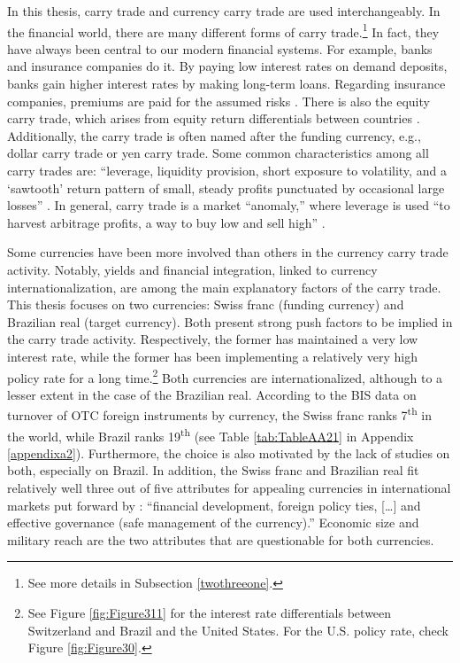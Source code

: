 \documentclass[a4paper, twoside]{templates/ociamthesis}
\begin{document}
In this thesis, carry trade and currency carry trade are used interchangeably. In the financial world, there are many different forms of carry trade.\footnote{See more details in Subsection \ref{twothreeone}.} In fact, they have always been central to our modern financial systems. For example, banks and insurance companies do it. By paying low interest rates on demand deposits, banks gain higher interest rates by making long-term loans. Regarding insurance companies, premiums are paid for the assumed risks \autocite{lee2020}. There is also the equity carry trade, which arises from equity return differentials between countries \autocite{girardin2019}. Additionally, the carry trade is often named after the funding currency, e.g., dollar carry trade or yen carry trade. Some common characteristics among all carry trades are: ``leverage, liquidity provision, short exposure to volatility, and a `sawtooth' return pattern of small, steady profits punctuated by occasional large losses'' \autocite[ 3]{lee2020}. In general, carry trade is a market ``anomaly,'' where leverage is used ``to harvest arbitrage profits, a way to buy low and sell high'' \autocite[ 83]{mehrling2010}.

Some currencies have been more involved than others in the currency carry trade activity. Notably, yields and financial integration, linked to currency internationalization, are among the main explanatory factors of the carry trade. This thesis focuses on two currencies: Swiss franc (funding currency) and Brazilian real (target currency). Both present strong push factors to be implied in the carry trade activity. Respectively, the former has maintained a very low interest rate, while the former has been implementing a relatively very high policy rate for a long time.\footnote{See Figure \ref{fig:Figure311} for the interest rate differentials between Switzerland and Brazil and the United States. For the U.S. policy rate, check Figure \ref{fig:Figure30}.} Both currencies are internationalized, although to a lesser extent in the case of the Brazilian real. According to the BIS data on turnover of OTC foreign instruments by currency, the Swiss franc ranks 7\textsuperscript{th} in the world, while Brazil ranks 19\textsuperscript{th} (see Table \ref{tab:TableAA21} in Appendix \ref{appendixa2}). Furthermore, the choice is also motivated by the lack of studies on both, especially on Brazil. In addition, the Swiss franc and Brazilian real fit relatively well three out of five attributes for appealing currencies in international markets put forward by \autocite[ 3]{cohen2015}: ``financial development, foreign policy ties, {[}\ldots{]} and effective governance (safe management of the currency).'' Economic size and military reach are the two attributes that are questionable for both currencies.
\end{document}
